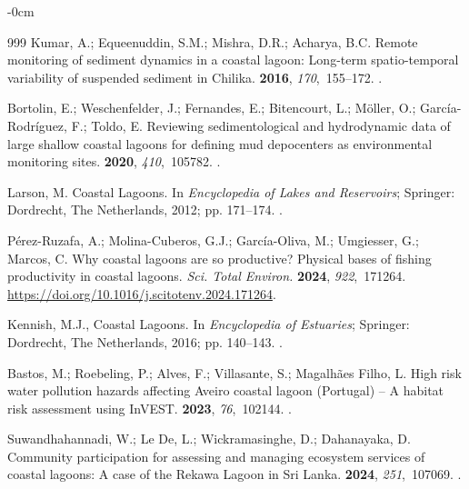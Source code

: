 \documentclass[jmse,article,accept,pdftex,oneauthor]{Definitions/mdpi}
\begin{document}
\begin{adjustwidth}{-\extralength}{0cm}
\begin{thebibliography}{999}
Kumar, A.; Equeenuddin, S.M.; Mishra, D.R.; Acharya, B.C.
\newblock Remote monitoring of sediment dynamics in a coastal lagoon: Long-term
  spatio-temporal variability of suspended sediment in Chilika.
 {\bf 2016}, {\em
  170},~155--172.
.

Bortolin, E.; Weschenfelder, J.; Fernandes, E.; Bitencourt, L.; Möller, O.;
  García-Rodríguez, F.; Toldo, E.
\newblock Reviewing sedimentological and hydrodynamic data of large shallow
  coastal lagoons for defining mud depocenters as environmental monitoring
  sites.
 {\bf 2020}, {\em 410},~105782.
.

Larson, M. Coastal Lagoons.
\newblock In {\em Encyclopedia of Lakes and Reservoirs}; Springer: Dordrecht, The Netherlands,
 2012; pp. 171--174.
.

Pérez-Ruzafa, A.; Molina-Cuberos, G.J.; García-Oliva, M.; Umgiesser, G.;
  Marcos, C.
\newblock Why coastal lagoons are so productive? Physical bases of fishing
  productivity in coastal lagoons. {\em Sci. Total Environ.} {\bf 2024}, {\em 922},~171264.
\newblock
  {\url{https://doi.org/10.1016/j.scitotenv.2024.171264}}.

Kennish, M.J., Coastal Lagoons. In {\em Encyclopedia of Estuaries}; Springer: Dordrecht, The Netherlands,
  2016; pp. 140--143.
.

Bastos, M.; Roebeling, P.; Alves, F.; Villasante, S.; {Magalhães Filho}, L.
\newblock High risk water pollution hazards affecting Aveiro coastal lagoon
  (Portugal) – A habitat risk assessment using InVEST.
 {\bf 2023}, {\em 76},~102144.
.

Suwandhahannadi, W.; {Le De}, L.; Wickramasinghe, D.; Dahanayaka, D.
\newblock Community participation for assessing and managing ecosystem services
  of coastal lagoons: A case of the Rekawa Lagoon in Sri Lanka.
 {\bf 2024}, {\em 251},~107069.
.


\end{thebibliography}
\end{adjustwidth}
\end{document}
